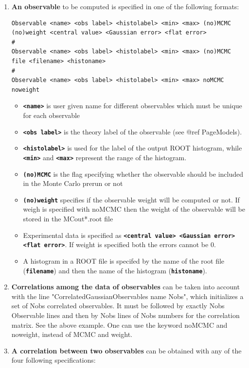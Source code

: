 \documentclass[preprint,3p,12pt]{elsarticle}
\begin{document}
{\begin{enumerate}
\item  {\bf An observable} to be computed is specified in one of the following formats:
\begin{lstlisting}
Observable <name> <obs label> <histolabel> <min> <max> (no)MCMC (no)weight <central value> <Gaussian error> <flat error>
#
Observable <name> <obs label> <histolabel> <min> <max> (no)MCMC file <filename> <histoname>
#
Observable <name> <obs label> <histolabel> <min> <max> noMCMC noweight
\end{lstlisting}
\begin{itemize}
  \item {\bf \texttt{<name>}} is user given name for different observables which must be unique for each observable
  \item {\bf \texttt{<obs label>}} is the theory label of the observable (see @ref PageModels).
  \item {\bf \texttt{<histolabel>}} is used for the label of the output ROOT histogram,
  while {\bf \texttt{<min>}} and {\bf \texttt{<max>}} represent the range of the histogram.
  \item  {\bf \texttt{(no)MCMC}} is the flag specifying whether the observable should be included in the Monte Carlo prerun or not 
  \item {\bf \texttt{(no)weight}} specifies if the observable weight will be computed or not. If weigh is specified with noMCMC
    then the weight of the observable will be stored in the MCout*.root file
  \item Experimental data is specified as {\bf \texttt{<central value>  <Gaussian error>  <flat error>}}. If weight is specified
    both the errors cannot be 0.
  \item A histogram in a ROOT file is specifed by the name of the root file ({\bf \texttt{filename}}) and then the
    name of the histogram ({\bf \texttt{histoname}}).
\end{itemize}

\item  {\bf Correlations among the data of observables} can be taken into
   account with the line "CorrelatedGaussianObservables name Nobs",
   which initializes a set of Nobs correlated observables. It must be
   followed by exactly Nobs Observable lines and then by Nobs lines of
   Nobs numbers for the correlation matrix. See the above example.
   One can use the keyword noMCMC and noweight, instead of MCMC and weight.

\item  {\bf A correlation between two observables} can be obtained with any of the four following specifications: 


\end{enumerate}}
\end{document}
